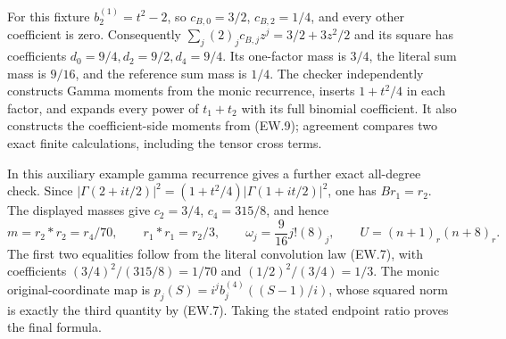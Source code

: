 For this fixture $b_2^{(1)}=t^2-2$, so
$c_{B,0}=3/2$, $c_{B,2}=1/4$, and every other coefficient is
zero. Consequently $\sum_j(2)_jc_{B,j}z^j=3/2+3z^2/2$ and
its square has coefficients $d_0=9/4,d_2=9/2,d_4=9/4$.
Its one-factor mass is $3/4$, the literal sum mass is $9/16$,
and the reference sum mass is $1/4$. The checker independently
constructs Gamma moments from the monic recurrence, inserts
$1+t^2/4$ in each factor, and expands every power of
$t_1+t_2$ with its full binomial coefficient. It also constructs
the coefficient-side moments from (EW.9); agreement compares
two exact finite calculations, including the tensor cross terms.

In this auxiliary example gamma recurrence gives a further exact
all-degree check. Since
$|\Gamma(2+it/2)|^2=(1+t^2/4)|\Gamma(1+it/2)|^2$, one has
$Br_1=r_2$. The displayed masses give
$c_2=3/4$, $c_4=315/8$, and hence
\[
 m=r_2*r_2=r_4/70,\qquad
 r_1*r_1=r_2/3,\qquad
 \omega_j=\frac9{16}j!(8)_j,\qquad
 U=(n+1)_r(n+8)_r.                                         \tag{EW.50}
\]
The first two equalities follow from the literal convolution law
(EW.7), with coefficients $(3/4)^2/(315/8)=1/70$ and
$(1/2)^2/(3/4)=1/3$. The monic original-coordinate map is
$p_j(S)=i^jb_j^{(4)}((S-1)/i)$, whose squared norm is exactly
the third quantity by (EW.7). Taking the stated endpoint ratio
proves the final formula.

